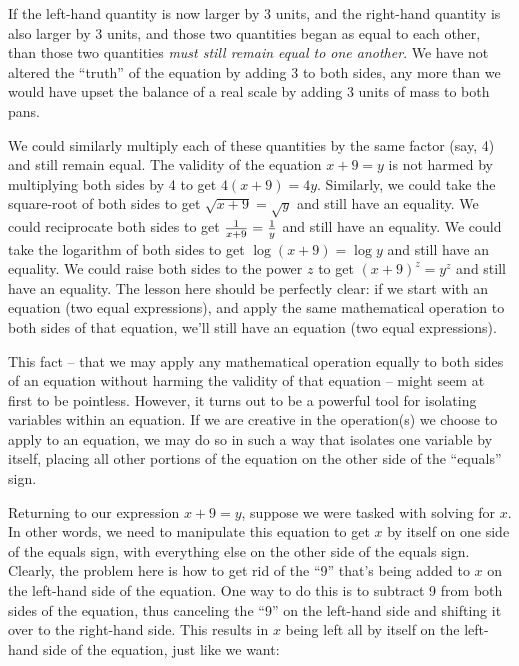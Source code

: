 If the left-hand quantity is now larger by 3 units, and the right-hand quantity is also larger by 3 units, and those two quantities began as equal to each other, than those two quantities \textit{must still remain equal to one another}.  We have not altered the ``truth'' of the equation by adding 3 to both sides, any more than we would have upset the balance of a real scale by adding 3 units of mass to both pans.

We could similarly multiply each of these quantities by the same factor (say, 4) and still remain equal.  The validity of the equation $x + 9 = y$ is not harmed by multiplying both sides by 4 to get $4(x + 9) = 4y$.  Similarly, we could take the square-root of both sides to get $\sqrt{x + 9} = \sqrt{y}$ and still have an equality.  We could reciprocate both sides to get ${1 \over {x + 9}} = {1 \over y}$ and still have an equality.  We could take the logarithm of both sides to get $\log (x + 9) = \log y$ and still have an equality.  We could raise both sides to the power $z$ to get $(x + 9)^z = y^z$ and still have an equality.  The lesson here should be perfectly clear: if we start with an equation (two equal expressions), and apply the same mathematical operation to both sides of that equation, we'll still have an equation (two equal expressions).

\vskip 10pt

This fact -- that we may apply any mathematical operation equally to both sides of an equation without harming the validity of that equation -- might seem at first to be pointless.  However, it turns out to be a powerful tool for isolating variables within an equation.  If we are creative in the operation(s) we choose to apply to an equation, we may do so in such a way that isolates one variable by itself, placing all other portions of the equation on the other side of the ``equals'' sign.

Returning to our expression $x + 9 = y$, suppose we were tasked with solving for $x$.  In other words, we need to manipulate this equation to get $x$ by itself on one side of the equals sign, with everything else on the other side of the equals sign.  Clearly, the problem here is how to get rid of the ``9'' that's being added to $x$ on the left-hand side of the equation.  One way to do this is to subtract 9 from both sides of the equation, thus canceling the ``9'' on the left-hand side and shifting it over to the right-hand side.  This results in $x$ being left all by itself on the left-hand side of the equation, just like we want:

